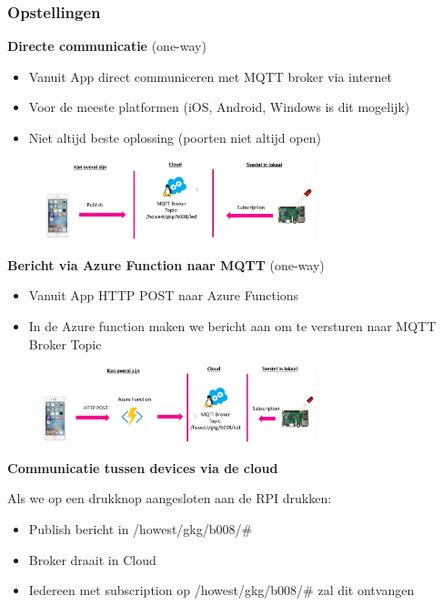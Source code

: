 \documentclass{article}
\newcommand{\bold}[1]{\textbf{#1}}
\begin{document}
\subsubsection{Opstellingen}

\bold{Directe communicatie} (one-way)

\begin{itemize}
    \item Vanuit App direct communiceren met MQTT broker via internet
    \item Voor de meeste platformen (iOS, Android, Windows is dit mogelijk)
    \item Niet altijd beste oplossing (poorten niet altijd open)
\end{itemize}

\begin{figure}[H]
    \centering
    \includegraphics[width=0.7\textwidth]{mqtt-com1.png}
    \caption{}
\end{figure}


\bold{Bericht via Azure Function naar MQTT} (one-way)

\begin{itemize}
    \item Vanuit App HTTP POST naar Azure Functions
    \item In de Azure function maken we bericht aan om te versturen naar MQTT Broker Topic
\end{itemize}

\begin{figure}[H]
    \centering
    \includegraphics[width=0.7\textwidth]{mqtt-com2.png}
    \caption{}
\end{figure}

\bold{Communicatie tussen devices via de cloud}

Als we op een drukknop aangesloten aan de RPI drukken: 
\begin{itemize}
    \item Publish bericht in /howest/gkg/b008/\#
    \item Broker draait in Cloud
    \item Iedereen met subscription op /howest/gkg/b008/\# zal dit ontvangen
\end{itemize}
\end{document}
